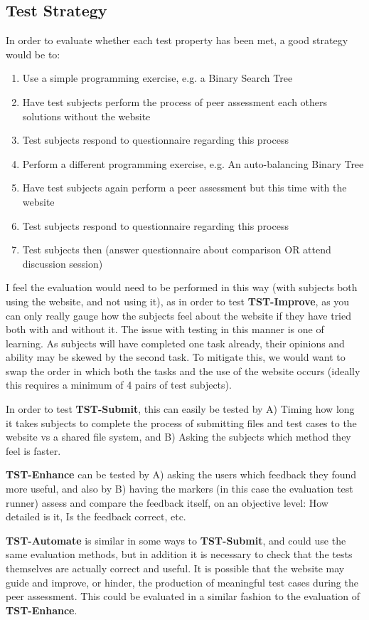 \documentclass[a4paper,11pt]{report}
\begin{document}
\subsection{Test Strategy}
In order to evaluate whether each test property has been met, a good strategy would be to:
\begin{enumerate}
 \item Use a simple programming exercise, e.g. a Binary Search Tree
 \item Have test subjects perform the process of peer assessment each others solutions without the website
 \item Test subjects respond to questionnaire regarding this process
 \item Perform a different programming exercise, e.g. An auto-balancing Binary Tree
 \item Have test subjects again perform a peer assessment but this time with the website
 \item Test subjects respond to questionnaire regarding this process
 \item Test subjects then (answer questionnaire about comparison OR attend discussion session)
\end{enumerate}
I feel the evaluation would need to be performed in this way (with subjects both using the website, and not using it), as in order to test \textbf{TST-Improve}, as you can only really gauge how the subjects feel about the website if they have tried both with and without it. The issue with testing in this manner is one of learning. As subjects will have completed one task already, their opinions and ability may be skewed by the second task. To mitigate this, we would want to swap the order in which both the tasks and the use of the website occurs (ideally this requires a minimum of 4 pairs of test subjects).\par
In order to test \textbf{TST-Submit}, this can easily be tested by A) Timing how long it takes subjects to complete the process of submitting files and test cases to the website vs a shared file system, and B) Asking the subjects which method they feel is faster.\par
\textbf{TST-Enhance} can be tested by A) asking the users which feedback they found more useful, and also by B) having the markers (in this case the evaluation test runner) assess and compare the feedback itself, on an objective level: How detailed is it, Is the feedback correct, etc.\par
\textbf{TST-Automate} is similar in some ways to \textbf{TST-Submit}, and could use the same evaluation methods, but in addition it is necessary to check that the tests themselves are actually correct and useful. It is possible that the website may guide and improve, or hinder, the production of meaningful test cases during the peer assessment. This could be evaluated in a similar fashion to the evaluation of \textbf{TST-Enhance}.
\end{document}
